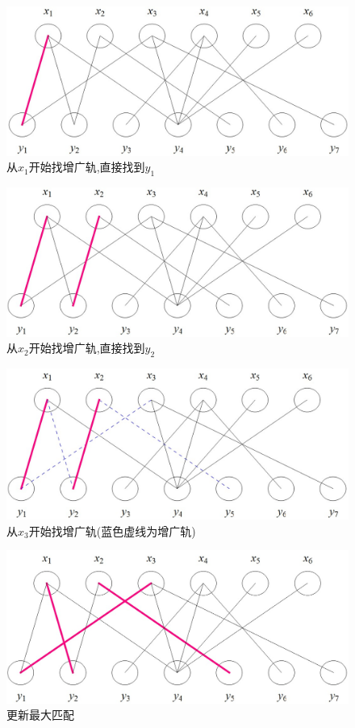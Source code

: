 \documentclass[a4paper,cs4size,oneside,fancyhdr]{ctexrep}
\theoremstyle{nonumberplain}%
\theoremstyle{nonumberplain}%
\begin{document}
{{\begin{figure}[htbp]%
\centering
\includegraphics[scale=0.45]{p2.jpg}
\caption{从$x_1$开始找增广轨,直接找到$y_1$}
\end{figure}

\begin{figure}[htbp]%
\centering
\includegraphics[scale=0.45]{p3.jpg}
\caption{从$x_2$开始找增广轨,直接找到$y_2$}
\end{figure}

\begin{figure}[htbp]%
\centering
\includegraphics[scale=0.45]{p4.jpg}
\caption{从$x_3$开始找增广轨(蓝色虚线为增广轨)}
\end{figure}

\begin{figure}[htbp]%
\centering
\includegraphics[scale=0.45]{p5.jpg}
\caption{更新最大匹配}
\end{figure}

}}
\end{document}
